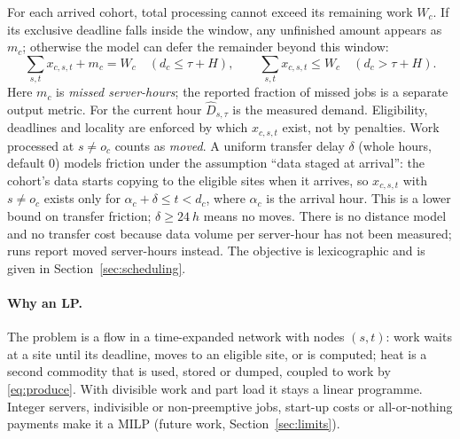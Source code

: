 For each arrived cohort, total processing cannot exceed its remaining work $W_c$.
If its exclusive deadline falls inside the window, any unfinished amount appears as
$m_c$; otherwise the model can defer the remainder beyond this window:
\begin{equation}
  \sum_{s,t}x_{c,s,t}+m_c=W_c\quad(d_c\le\tau+H),\qquad
  \sum_{s,t}x_{c,s,t}\le W_c\quad(d_c>\tau+H).
  \label{eq:work}
\end{equation}
Here $m_c$ is \emph{missed server-hours}; the reported fraction of missed jobs is a
separate output metric.
For the current hour $\hat D_{s,\tau}$ is the measured demand. Eligibility, deadlines and
locality are enforced by which $x_{c,s,t}$ exist, not by penalties. Work processed at $s \ne o_c$
counts as \emph{moved}. A uniform transfer delay $\delta$ (whole hours, default 0)
models friction under the assumption ``data staged at arrival'': the cohort's data starts copying to
the eligible sites when it arrives, so $x_{c,s,t}$ with $s \ne o_c$ exists only for
$\alpha_c + \delta \le t < d_c$, where $\alpha_c$ is the arrival hour. This is a lower bound on
transfer friction; $\delta \ge \qty{24}{h}$ means no moves. There is no distance model and no
transfer cost because data volume per server-hour has not been measured; runs report moved
server-hours instead. The objective is lexicographic and is given in Section~\ref{sec:scheduling}.

\paragraph{Why an LP.} The problem is a flow in a time-expanded network with nodes $(s,t)$: work
waits at a site until its deadline, moves to an eligible site, or is computed; heat is a second
commodity that is used, stored or dumped, coupled to work by \eqref{eq:produce}.
With divisible work and part load it stays a
linear programme. Integer servers, indivisible or non-preemptive jobs, start-up costs or
all-or-nothing payments make it a MILP (future work, Section~\ref{sec:limits}).
